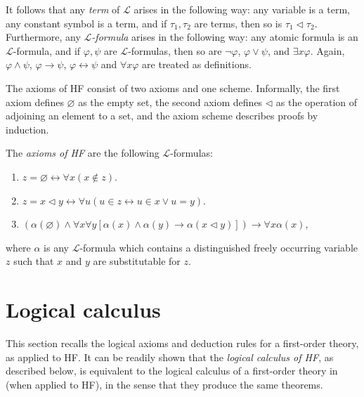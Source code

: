 It follows that any \textit{term} of $\mathcal{L}$ arises in the following way:
any variable is a term, any constant symbol is a term, and if $\tau_1, \tau_2$ are terms, then so is
$\tau_1 \lhd \tau_2$.
Furthermore, any \textit{$\mathcal{L}$-formula} arises in the following way:
any atomic formula is an $\mathcal{L}$-formula, and if $\varphi, \psi$ are $\mathcal{L}$-formulas, 
then so are $\neg \varphi$, $\varphi \lor \psi$, and $\exists x \varphi$.
Again, $\varphi \land \psi$, $\varphi \rightarrow \psi$, $\varphi \leftrightarrow \psi$ and
$\forall x \varphi$ are treated as definitions.

The axioms of HF consist of two axioms and one scheme. 
Informally, the first axiom defines $\varnothing$ as the
empty set, the second axiom defines $\lhd$ as the operation of adjoining an element to a set,
and the axiom scheme describes proofs by induction.

\begin{definition}
    \label{def:Axioms}
    \leanok
    The \textit{axioms of HF} are the following $\mathcal{L}$-formulas:
    \begin{enumerate}
        \item $z=\varnothing \leftrightarrow \forall x(x \notin z)$.
        \item $z=x \lhd y \leftrightarrow \forall u(u \in z \leftrightarrow u \in x \lor u=y)$.
        \item $(\alpha(\varnothing) \land \forall x \forall y[\alpha(x) \land \alpha(y) \rightarrow 
        \alpha(x \lhd y)]) \rightarrow \forall x \alpha(x)$,
    \end{enumerate}
    where $\alpha$ is any $\mathcal{L}$-formula which contains a 
    distinguished freely occurring variable $z$ such that $x$ and $y$ are substitutable for $z$.
\end{definition}

\section{Logical calculus}

This section recalls the logical axioms and deduction rules for a first-order theory, 
as applied to HF. 
It can be readily shown that the \textit{logical calculus of HF}, as described below, 
is equivalent to the logical calculus of a first-order theory in \cite{shoenfield1967mathematical} 
(when applied to HF), in the sense that they produce the same theorems.


